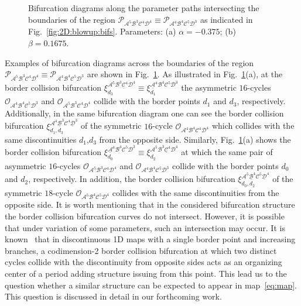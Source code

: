 \documentclass[10pt]{article}
\newif\ifFigs       \Figsfalse
\renewcommand{\P}{{\mathcal P}}
\newcommand{\A}{{\mathcal A}}
\newcommand{\B}{{\mathcal B}}
\newcommand{\C}{{\mathcal C}}
\newcommand{\D}{{\mathcal D}}
\newcommand{\LC}{{\mathcal O}}
\newcommand{\Includegraphics}[2]%
           {\centering
             \ifFigs\texttt{[image: \#2]}%
             \else  \texttt{[image: \#2]}\fi}
\newcommand{\Includesubgraphics}[3]%
{\begin{minipage}[b]{#1}
    \Includegraphics{\textwidth}{#2}\\
    \centerline{{\footnotesize (#3)}}
  \end{minipage}
}
\begin{document}
\medskip


\begin{figure}[t]
	\caption{\label{fig:1D:P16:bifs}Bifurcation diagrams along the
		parameter paths intersecting the boundaries of the region
		$\P_{\A^{5}\B^3\C^{4}\D^{4}} \equiv \P_{\A^{4}\B^{4}\C^{5}\D^3}$
		as indicated in Fig.~\ref{fig:2D:blowup:bifs}. Parameters: (a)
		$\alpha=-0.375$; (b) $\beta=0.1675$.}
\end{figure}


Examples of bifurcation diagrams across the boundaries of the region
$\P_{\A^{5}\B^3\C^{4}\D^{4}} \equiv \P_{\A^{4}\B^{4}\C^{5}\D^3}$ are
shown in Fig.~\ref{fig:1D:P16:bifs}. As illustrated in
Fig.~\ref{fig:1D:P16:bifs}(a), at the border collision bifurcation
$\xi^{\A^{5}\B^{3}\underline{\C}^{4}\D^4}_{d_3} \equiv
	\xi^{\underline{\A}^{4}\B^4\C^{5}\D^{3}}_{d_1}$ the asymmetric
$16$-cycles $\LC_{\A^{4}\B^4\C^{5}\D^{3}}$ and
$\LC_{\A^{5}\B^{3}\C^{4}\D^4}$ collide with the border points $d_1$
and $d_3$, respectively. Additionally, in the same bifurcation diagram
one can see the border collision bifurcation
$\xi^{\A^{4}\underline{\B}^{3}\C^{4}\underline{\D}^3}_{d_1,d_3}$ of
the symmetric $16$-cycle $\LC_{\A^{4}\B^{4}\C^{4}\D^4}$ which collides
with the same discontinuities $d_1$,$d_3$ from the opposite side.
Similarly, Fig.~\ref{fig:1D:P16:bifs}(a) shows the border collision
bifurcation $\xi^{\underline{\A}^{4}\B^4\C^{5}\D^{3}}_{d_0} \equiv
	\xi^{\A^{5}\B^{3}\underline{\C}^{4}\D^4}_{d_2}$ at which the same pair
of asymmetric $16$-cycles $\LC_{\A^{5}\B^{3}\C^{4}\D^4}$ and
$\LC_{\A^{4}\B^4\C^{5}\D^{3}}$ collide with the border points $d_0$
and $d_2$, respectively. In addition, the border collision bifurcation
$\xi^{\A^{5}\underline{\B}^{4}\C^{5}\underline{\D}^4}_{d_0,d_2}$ of
the symmetric $18$-cycle $\LC_{\A^{5}\B^{4}\C^{5}\D^4}$ collides with
the same discontinuities from the opposite side. It is worth
mentioning that in the considered bifurcation structure the border
collision bifurcation curves do not intersect. However, it is possible
that under variation of some parameters, such an intersection may
occur. It is known~\cite{} that in discontinuous 1D maps with a single
border point and increasing branches, a codimension-2 border collision
bifurcation at which two distinct cycles collide with the
discontinuity from opposite sides acts as an organizing center of a
period adding structure issuing from this point.  This lead us to the
question whether a similar structure can be expected to appear in
map~\eqref{eq:map}. This question is discussed in detail in our
forthcoming work.
\end{document}

